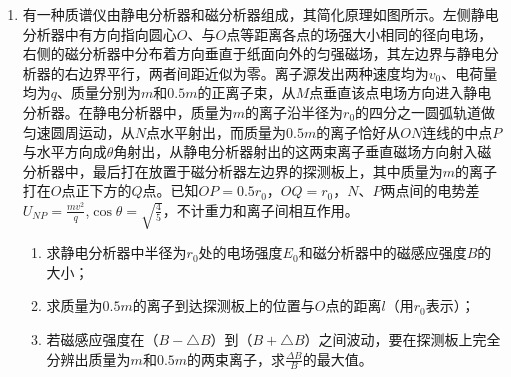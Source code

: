 \begin{enumerate}[leftmargin=0em]
\newpage
\item
{}
有一种质谱仪由静电分析器和磁分析器组成，其简化原理如图所示。左侧静电分析器中有方向指向圆心$ O $、与$ O $点等距离各点的场强大小相同的径向电场，右侧的磁分析器中分布着方向垂直于纸面向外的匀强磁场，其左边界与静电分析器的右边界平行，两者间距近似为零。离子源发出两种速度均为$ v_{0} $、电荷量均为$ q $、质量分别为$ m $和$ 0.5m $的正离子束，从$ M $点垂直该点电场方向进入静电分析器。在静电分析器中，质量为$ m $的离子沿半径为$ r_{0} $的四分之一圆弧轨道做匀速圆周运动，从$ N $点水平射出，而质量为$ 0.5m $的离子恰好从$ ON $连线的中点$ P $与水平方向成$ \theta $角射出，从静电分析器射出的这两束离子垂直磁场方向射入磁分析器中，最后打在放置于磁分析器左边界的探测板上，其中质量为$ m $的离子打在$ O $点正下方的$ Q $点。已知$ OP=0.5r_0 $，$ OQ=r_0 $，$ N $、$ P $两点间的电势差$U _ { N P } = \frac { m v ^ { 2 } } { q }$,$\cos \theta = \sqrt { \frac { 4 } { 5 } }$，不计重力和离子间相互作用。
\begin{enumerate}
\renewcommand{\labelenumi}{\arabic{enumi}.}
\item
求静电分析器中半径为$ r_{0} $处的电场强度$ E_{0} $和磁分析器中的磁感应强度$ B $的大小；
\item 
求质量为$ 0.5m $的离子到达探测板上的位置与$ O $点的距离$ l $（用$ r_{0} $表示）；
\item 
若磁感应强度在（$ B - \triangle B $）到（$ B + \triangle B $）之间波动，要在探测板上完全分辨出质量为$ m $和$ 0.5m $的两束离子，求$\frac { \Delta B } { B }$的最大值。



\end{enumerate}
\begin{figure}[h!]
\flushright

\end{figure}

\end{enumerate}
